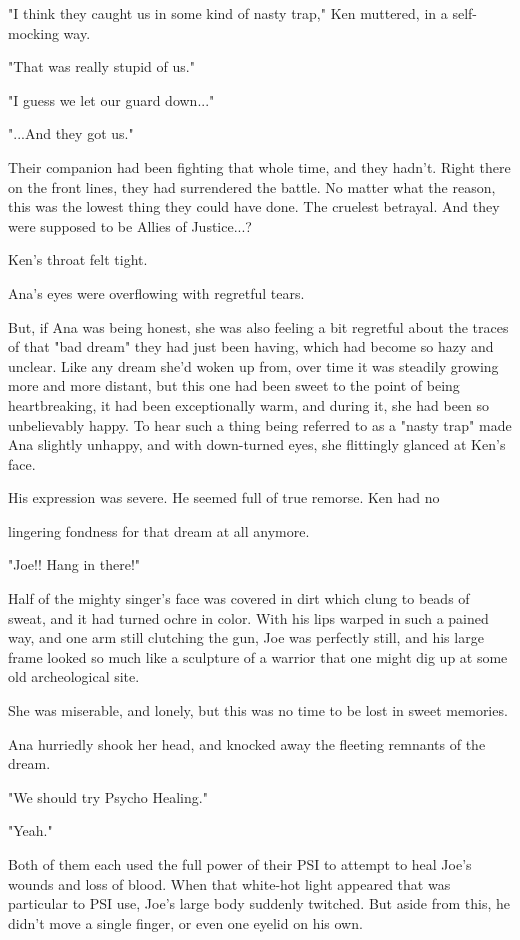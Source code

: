 \documentclass[
]{article}
\begin{document}
"I think they caught us in some kind of nasty trap," Ken muttered, in a
self-mocking way.

"That was really stupid of us."

"I guess we let our guard down..."

"...And they got us."

Their companion had been fighting that whole time, and they hadn't.
Right there on the front lines, they had surrendered the battle. No
matter what the reason, this was the lowest thing they could have done.
The cruelest betrayal. And they were supposed to be Allies of
Justice...?

Ken's throat felt tight.

Ana's eyes were overflowing with regretful tears.

But, if Ana was being honest, she was also feeling a bit regretful about
the traces of that "bad dream" they had just been having, which had
become so hazy and unclear. Like any dream she'd woken up from, over
time it was steadily growing more and more distant, but this one had
been sweet to the point of being heartbreaking, it had been
exceptionally warm, and during it, she had been so unbelievably happy.
To hear such a thing being referred to as a "nasty trap" made Ana
slightly unhappy, and with down-turned eyes, she flittingly glanced at
Ken's face.

His expression was severe. He seemed full of true remorse. Ken had no

lingering fondness for that dream at all anymore.

"Joe!! Hang in there!"

Half of the mighty singer's face was covered in dirt which clung to
beads of sweat, and it had turned ochre in color. With his lips warped
in such a pained way, and one arm still clutching the gun, Joe was
perfectly still, and his large frame looked so much like a sculpture of
a warrior that one might dig up at some old archeological site.

She was miserable, and lonely, but this was no time to be lost in sweet
memories.

Ana hurriedly shook her head, and knocked away the fleeting remnants of
the dream.

"We should try Psycho Healing."

"Yeah."

Both of them each used the full power of their PSI to attempt to heal
Joe's wounds and loss of blood. When that white-hot light appeared that
was particular to PSI use, Joe's large body suddenly twitched. But aside
from this, he didn't move a single finger, or even one eyelid on his
own.
\end{document}

